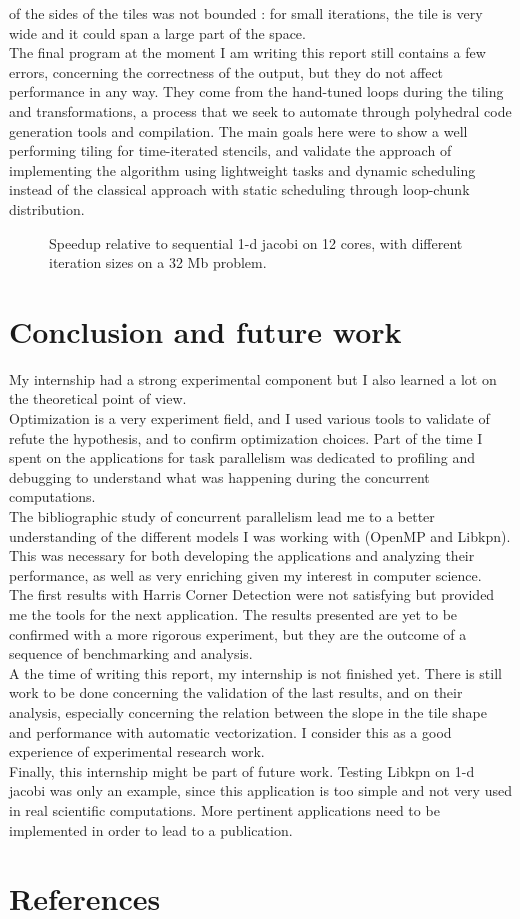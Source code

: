 \documentclass[a4paper,11pt]{article}
\begin{document}
of the sides of the tiles was not bounded : for small iterations, the tile is very wide
and it could span a large part of the space. \\
The final program at the moment I am writing this report still contains a few errors, 
concerning the correctness of the output, but they do not affect performance in any way. 
They come from the hand-tuned loops during the tiling and transformations, a process 
that we seek to automate through polyhedral code generation tools and
compilation. The main goals here were to show a well performing tiling for time-iterated
stencils, and validate the approach of implementing the algorithm using lightweight tasks
and dynamic scheduling instead of the classical approach with static scheduling through
loop-chunk distribution.
\begin{figure}[h]
  \begin{center}
  
  \end{center}
 \caption{Speedup relative to sequential 1-d jacobi on 12 cores, with different iteration 
 sizes on a 32 Mb problem.}
 \label{results_hdiam_var}
\end{figure}

\newpage
\section{Conclusion and future work}
My internship had a strong experimental component but I also learned a lot on the theoretical point
of view. \\
Optimization is a very experiment field, and I used various tools to validate of refute the 
hypothesis, and to confirm optimization choices. Part of the time I spent on the applications for task
parallelism was dedicated to profiling and debugging to understand what was happening during the concurrent
computations.\\
The bibliographic study of concurrent parallelism lead me to a better understanding of the different
models I was working with (OpenMP and Libkpn). This was necessary for both developing the applications
and analyzing their performance, as well as very enriching given my interest in computer science.\\
The first results with Harris Corner Detection were not satisfying but provided me the tools
for the next application. The results presented are yet to be confirmed with a more rigorous 
experiment, but they are the outcome of a sequence of benchmarking and analysis.\\
A the time of writing this report, my internship is not finished yet. There is still work to be done
concerning the validation of the last results, and on their analysis, especially concerning the relation 
between the slope in the tile shape and performance with automatic vectorization. I consider this
as a good experience of experimental research work.\\
Finally, this internship might be part of future work. Testing Libkpn on 1-d jacobi was only an example,
since this application is too simple and not very used in real scientific computations. More pertinent
applications need to be implemented in order to lead to a publication.


\newpage
\section{References}

\end{document}
